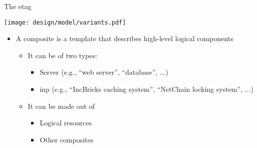 \begin{frame}{The \Gls*{etag}}

    \vspace{2mm}

    \centering
    \texttt{[image: design/model/variants.pdf]}

    \vspace{1mm}

    \begin{itemize}
        \item A composite is a template that describes high-level logical components
        \begin{itemize}
            \item It can be of two types:
            \begin{itemize}
                \item Server (e.g., “web server”, “database”, ...)
                \item \gls*{inp} (e.g., “IncBricks caching system”, “NetChain locking system”, ...)
            \end{itemize}
            \item It can be made out of
            \begin{itemize}
                \item Logical resources
                \item Other composites
            \end{itemize}
        \end{itemize}
    \end{itemize}

    
\end{frame}

